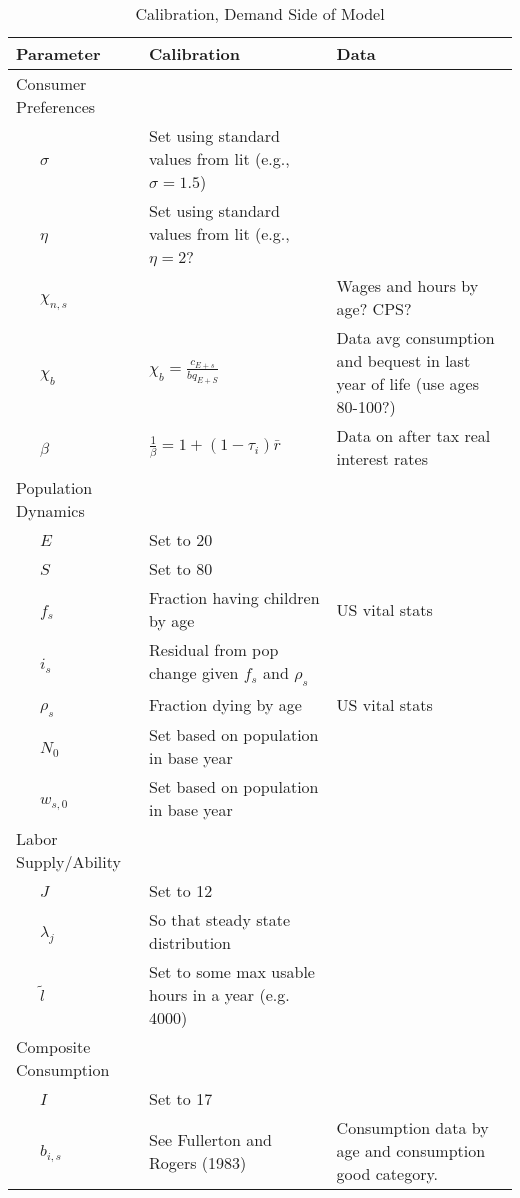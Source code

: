\documentclass[article,11pt,letterpaper,fleqn]{article}
\theoremstyle{definition}
\numberwithin{equation}{section}
\begin{document}
\begin{landscape}
\begin{table}[htbp]
  \centering
  \caption{Calibration, Demand Side of Model}
    \begin{tabular}{lll}
    \hline
    \hline
    Parameter & Calibration & Data \\
    \hline
    Consumer Preferences &       &  \\
    \ \ \ $\sigma$ & Set using standard values from lit (e.g., $\sigma=1.5$) &  \\
    \ \ \ $\eta$ & Set using standard values from lit (e.g., $\eta=2$? &  \\
    \ \ \ $\chi_{n,s}$ &       & Wages and hours by age?  CPS? \\
    \ \ \ $\chi_{b}$ & $\chi_{b}=\frac{c_{E+s}}{bq_{E+S}}$ & Data avg consumption and bequest in last year of life (use ages 80-100?) \\
    \ \ \ $\beta$ & $\frac{1}{\beta}=1+(1-\tau_{i})\bar{r}$ & Data on after tax real interest rates \\
    Population Dynamics &       &  \\
    \ \ \ $E$ & Set to 20 &  \\
    \ \ \ $S$ & Set to 80 &  \\
    \ \ \ $f_{s}$ & Fraction having children by age & US vital stats \\
    \ \ \ $i_{s}$ & Residual from pop change given $f_{s}$ and $\rho_{s}$ &  \\
    \ \ \ $\rho_{s}$ & Fraction dying by age & US vital stats \\
    \ \ \ $N_{0}$ & Set based on population in base year &  \\
    \ \ \ $w_{s,0}$ & Set based on population in base year &  \\
    Labor Supply/Ability &       &  \\
    \ \ \ $J$ & Set to 12 &  \\
    \ \ \ $\lambda_{j}$ & So that steady state distribution &  \\
    \ \ \ $\tilde{l}$ & Set to some max usable hours in a year (e.g. 4000) &  \\
    Composite Consumption &       &  \\
    \ \ \ $I$ & Set to 17 &  \\
    \ \ \ $b_{i,s}$ & See Fullerton and Rogers (1983) & Consumption data by age and consumption good category. \\

\end{tabular}
\end{table}
\end{landscape}
\end{document}
